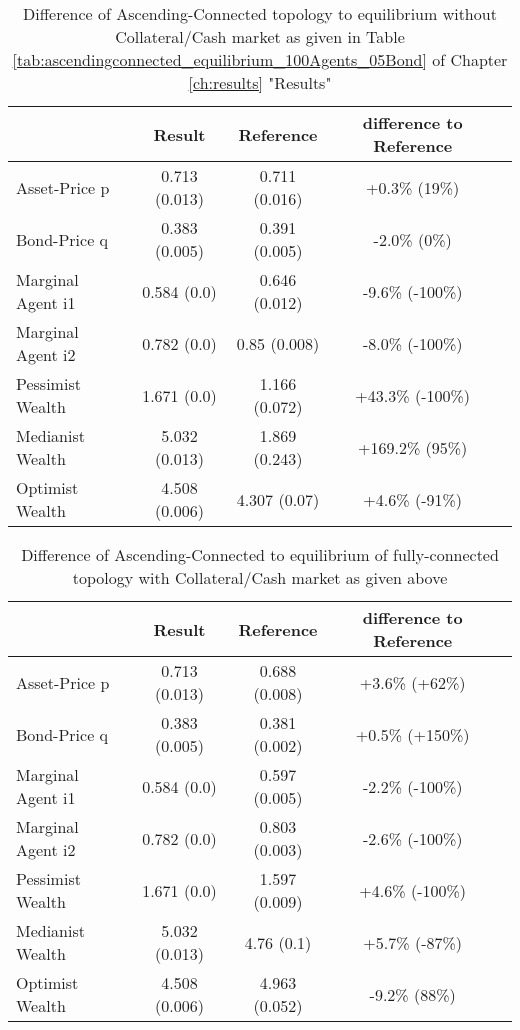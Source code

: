 \documentclass[Bachelorarbeit.tex]{subfiles}
\begin{document}
\begin{table}[H]
	\caption{Difference of Ascending-Connected topology to equilibrium without Collateral/Cash market as given in Table \ref{tab:ascendingconnected_equilibrium_100Agents_05Bond} of Chapter \ref{ch:results} "Results"}
	\centering
	\begin{tabular} { l c c c r }
		& Result & Reference & difference to Reference \\
		\hline
		Asset-Price p & 0.713 (0.013) & 0.711 (0.016) & +0.3\% (19\%) \\
		Bond-Price q & 0.383 (0.005) & 0.391 (0.005) & -2.0\% (0\%) \\
		Marginal Agent i1 & 0.584 (0.0) & 0.646 (0.012) & -9.6\% (-100\%) \\
		Marginal Agent i2 & 0.782 (0.0) & 0.85 (0.008) & -8.0\% (-100\%) \\
		\hline
		Pessimist Wealth & 1.671 (0.0) & 1.166 (0.072) & +43.3\% (-100\%) \\
		Medianist Wealth & 5.032 (0.013) & 1.869 (0.243) & +169.2\% (95\%) \\
		Optimist Wealth & 4.508 (0.006) & 4.307 (0.07) & +4.6\% (-91\%) \\
		\hline
	\end{tabular}
\end{table}

\begin{table}[H]
	\caption{Difference of Ascending-Connected to equilibrium of fully-connected topology with Collateral/Cash market as given above}
	\centering
	\begin{tabular} { l c c c r }
		& Result & Reference & difference to Reference \\
		\hline
		Asset-Price p & 0.713 (0.013) & 0.688 (0.008) & +3.6\% (+62\%) \\
		Bond-Price q & 0.383 (0.005) & 0.381 (0.002) & +0.5\% (+150\%) \\
		Marginal Agent i1 & 0.584 (0.0) & 0.597 (0.005) & -2.2\% (-100\%) \\
		Marginal Agent i2 & 0.782 (0.0) & 0.803 (0.003) & -2.6\% (-100\%) \\
		\hline
		Pessimist Wealth & 1.671 (0.0) & 1.597 (0.009) & +4.6\% (-100\%) \\
		Medianist Wealth & 5.032 (0.013) & 4.76 (0.1) & +5.7\% (-87\%) \\
		Optimist Wealth & 4.508 (0.006) & 4.963 (0.052) & -9.2\% (88\%) \\
		\hline
	\end{tabular}
\end{table}
\end{document}
